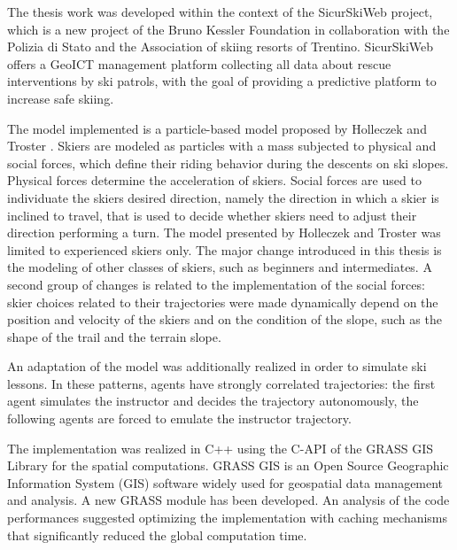 \documentclass[12pt,a4paper,twoside]{book}
\begin{document}
The thesis work was developed within the context of the SicurSkiWeb project, which is a new project of the Bruno Kessler Foundation in collaboration with the Polizia di Stato and the Association of skiing resorts of Trentino. SicurSkiWeb offers a GeoICT management platform collecting all data about rescue interventions by ski patrols, with the goal of providing a predictive platform to increase safe skiing.

The model implemented is a particle-based model proposed by Holleczek and Troster \cite{hol2012}. Skiers are modeled as particles with a mass subjected to physical and social forces, which define their riding behavior during the descents on ski slopes. Physical forces determine the acceleration of skiers. Social forces are used to individuate the skiers desired direction, namely the direction in which a skier is inclined to travel, that is used to decide whether skiers need to adjust their direction performing a turn. The model presented by Holleczek and Troster was limited to experienced skiers only. The major change introduced in this thesis is the modeling of other classes of skiers, such as beginners and intermediates. A second group of changes is related to the implementation of the social forces: skier choices related to their trajectories were made dynamically depend on the position and velocity of the skiers and on the condition of the slope, such as the shape of the trail and the terrain slope.

An adaptation of the model was additionally realized in order to simulate ski lessons. In these patterns, agents have strongly correlated trajectories: the first agent simulates the instructor and decides the trajectory autonomously, the following agents are forced to emulate the instructor trajectory.

The implementation was realized in C++ using the C-API of the GRASS GIS Library for the spatial computations. GRASS GIS is an Open Source Geographic Information System (GIS) software widely used for geospatial data management and analysis. A new GRASS module has been developed. An analysis of the code performances suggested optimizing the implementation with caching mechanisms that significantly reduced the global computation time.
\end{document}
